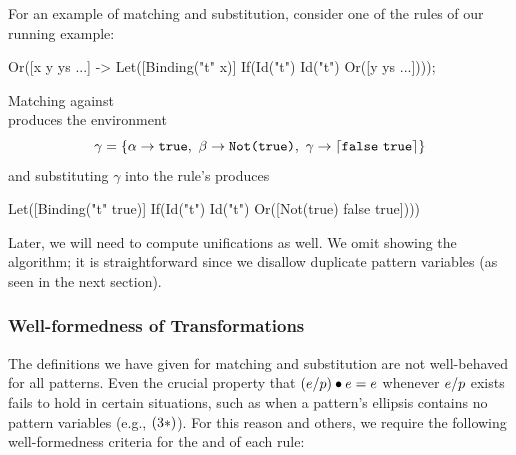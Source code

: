 For an example of matching and substitution, consider one of the rules of
our running  example:
\begin{Codes}
Or([x y ys ...] ->
  Let([Binding("t" x)]
      If(Id("t") Id("t") Or([y ys ...])));
\end{Codes}
Matching 
against \\ 
produces the environment
\[\gamma = \{
   \alpha \to \texttt{true},\
   \beta \to \texttt{Not(true)},\
   \gamma \to \lceil \texttt{false}\ \texttt{true} \rceil\}\]
and substituting $\gamma$ into the rule's  produces
\begin{Codes}
Let([Binding("t" true)]
    If(Id("t") Id("t") Or([Not(true) false true])))
\end{Codes}

Later, we will need to compute unifications as well. We omit showing the
algorithm; it is straightforward since we disallow duplicate pattern variables (as
seen in the next section).

\subsubsection{Well-formedness of Transformations}
\label{sec:reval-wf}

The definitions we have given for matching and substitution are not
well-behaved for all patterns. Even the crucial property that
$(e / p) \bullet e = e$ whenever $e / p$ exists fails to hold in certain
situations, such as when a pattern's ellipsis contains no pattern variables (e.g.,
$(3*)$). For this reason and others, we require the following
well-formedness criteria for the \Sc{lhs} and \Sc{rhs} of each rule:

